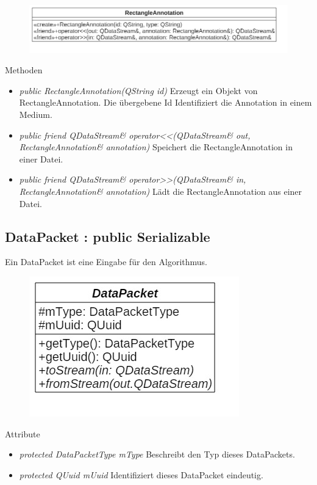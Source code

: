 \begin{figure}[H]
\centering
\includegraphics[scale=0.5]{img/Klassendiagramm/Klassen/RectangleAnnotation}
\label{fig:rectangleAnnotation}
\end{figure}

Methoden
\begin{itemize}
\item \textit{public RectangleAnnotation(QString id)} Erzeugt ein Objekt von RectangleAnnotation. Die übergebene Id Identifiziert die Annotation in einem Medium.
\item \textit{public friend QDataStream\& operator<<(QDataStream\& out, RectangleAnnotation\& annotation)} Speichert die RectangleAnnotation in einer Datei.
\item \textit{public friend QDataStream\& operator>>(QDataStream\& in, RectangleAnnotation\& annotation)} Lädt die RectangleAnnotation aus einer Datei.
\end{itemize}

\subsection*{DataPacket : public Serializable}
Ein DataPacket ist eine Eingabe für den Algorithmus.

\begin{figure}[H]
\centering
\includegraphics[scale=0.5]{img/Klassendiagramm/Klassen/DataPacket}
\label{fig:dataPacket}
\end{figure}

Attribute
\begin{itemize}
\item\textit{protected DataPacketType mType} Beschreibt den Typ dieses DataPackets.
\item\textit{protected QUuid mUuid} Identifiziert dieses DataPacket eindeutig. 
\end{itemize}

